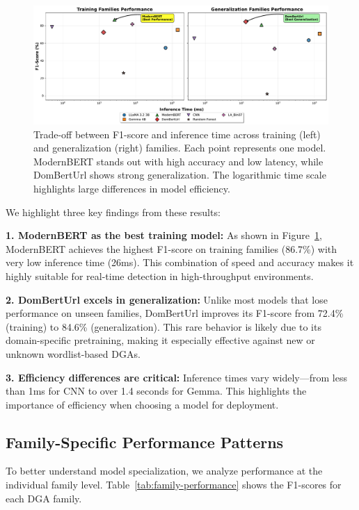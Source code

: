\documentclass[a4paper]{llncs}
\begin{document}
\begin{figure}[ht]
\centering
\includegraphics[width=1.0\textwidth]{performance_comparison.pdf}
\caption{Trade-off between F1-score and inference time across training (left) and generalization (right) families. Each point represents one model. ModernBERT stands out with high accuracy and low latency, while DomBertUrl shows strong generalization. The logarithmic time scale highlights large differences in model efficiency.}
\label{fig:performance_comparison}
\end{figure}

We highlight three key findings from these results:

\textbf{1. ModernBERT as the best training model:} As shown in Figure~\ref{fig:performance_comparison}, ModernBERT achieves the highest F1-score on training families (86.7\%) with very low inference time (26ms). This combination of speed and accuracy makes it highly suitable for real-time detection in high-throughput environments.

\textbf{2. DomBertUrl excels in generalization:} Unlike most models that lose performance on unseen families, DomBertUrl improves its F1-score from 72.4\% (training) to 84.6\% (generalization). This rare behavior is likely due to its domain-specific pretraining, making it especially effective against new or unknown wordlist-based DGAs.

\textbf{3. Efficiency differences are critical:} Inference times vary widely—from less than 1ms for CNN to over 1.4 seconds for Gemma. This highlights the importance of efficiency when choosing a model for deployment.

\subsection{Family-Specific Performance Patterns}

To better understand model specialization, we analyze performance at the individual family level. Table~\ref{tab:family-performance} shows the F1-scores for each DGA family.
\end{document}
